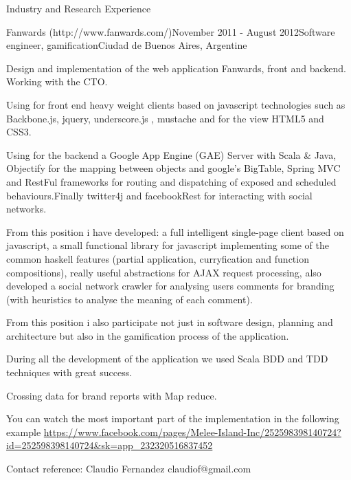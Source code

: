 \documentclass{resume} %
\begin{document}
\begin{rSection}{Industry and Research Experience}
\begin{rSubsection}{Fanwards (http://www.fanwards.com/)}{November 2011 - August 2012}{Software engineer, gamification}{Ciudad de Buenos Aires, Argentine}
	\item Design and implementation of the web application Fanwards, front and backend. Working with the CTO.
	\item Using for front end heavy weight clients based on javascript technologies such as Backbone.js, jquery, underscore.js , mustache and for the view HTML5 and CSS3.
	\item Using for the backend a Google App Engine (GAE) Server with Scala \& Java, Objectify for the mapping between objects and google's BigTable, Spring MVC and RestFul frameworks for routing and dispatching of exposed and scheduled behaviours.Finally twitter4j and facebookRest for interacting with social networks.  
	\item From this position i have developed: a full intelligent single-page client based on javascript,  a small functional library for javascript implementing some of the common haskell features (partial application, curryfication and function compositions), really useful abstractions for AJAX request processing, also developed a social network crawler for analysing users comments for branding (with heuristics to analyse the meaning of each comment). 
	\item From this position i also participate not just in software design, planning and architecture but also in the gamification process of the application.
	\item During all the development of the application we used Scala BDD and TDD techniques with great success.
	\item Crossing data for brand reports with Map reduce. 
	\item You can watch the most important part of the implementation in the following example 		
	\url{https://www.facebook.com/pages/Melee-Island-Inc/252598398140724?id=252598398140724&sk=app_232320516837452}
	
	\item Contact reference: Claudio Fernandez claudiof@gmail.com
\end{rSubsection}




\end{rSection}
\end{document}
